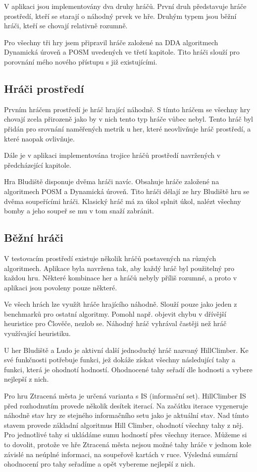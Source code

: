 V aplikaci jsou implementovány dva druhy hráčů. První druh představuje hráče prostředí, kteří se starají o náhodný prvek ve hře. Druhým typem jsou běžní hráči, kteří se chovají relativně rozumně.

Pro všechny tři hry jsem připravil hráče založené na DDA algoritmech Dynamická úroveň a POSM uvedených ve třetí kapitole. Tito hráči slouží pro porovnání mého nového přístupu s již existujícími.

\subsection{Hráči prostředí}

Prvním hráčem prostředí je hráč hrající náhodně. S tímto hráčem se všechny hry chovají zcela přirozeně jako by v nich tento typ hráče vůbec nebyl. Tento hráč byl přidán pro srovnání naměřených metrik u her, které neovlivňuje hráč prostředí, a které naopak ovlivňuje.

Dále je v aplikaci implementována trojice hráčů prostředí navržených v předcházející kapitole.

Hra Bludiště disponuje dvěma hráči navíc. Obsahuje hráče založené na algoritmech POSM a Dynamická úroveň. Tito hráči dělají ze hry Bludiště hru se dvěma soupeřícími hráči. Klasický hráč má za úkol splnit úkol, nalézt všechny bomby a jeho soupeř se mu v tom snaží zabránit. 

\subsection{Běžní hráči}

V testovacím prostředí existuje několik hráčů postavených na různých algoritmech. Aplikace byla navržena tak, aby každý hráč byl použitelný pro každou hru. Některé kombinace her a hráčů nebyly příliš rozumné, a proto v aplikaci jsou povoleny pouze některé.

Ve všech hrách lze využít hráče hrajícího náhodně. Slouží pouze jako jeden z benchmarků pro ostatní algoritmy. Pomohl např. objevit chybu v dřívější heuristice pro Člověče, nezlob se. Náhodný hráč vyhrával častěji než hráč využívající heuristiku.

U her Bludiště a Ludo je aktivní další jednoduchý hráč nazvaný HillClimber. Ke své funkčnosti potřebuje funkci, jež dokáže získat všechny následující tahy a funkci, která je ohodnotí hodností. Ohodnocené tahy seřadí dle hodnosti a vybere nejlepší z nich.

Pro hru Ztracená města je určená varianta s IS (informační set). HillClimber IS před rozhodnutím provede několik desítek iterací. Na začátku iterace vygeneruje náhodně stav hry ze stejného informačního setu jako je aktuální stav. Nad tímto stavem provede základní algoritmus Hill Climber, ohodnotí všechny tahy z něj. Pro jednotlivé tahy si ukládáme sumu hodností přes všechny iterace. Můžeme si to dovolit, protože ve hře Ztracená města nejsou možné tahy hráče v jednom kole závislé na neúplné informaci, na soupeřově kartách v ruce. Výsledná sumární ohodnocení pro tahy seřadíme a opět vybereme nejlepší z nich.

